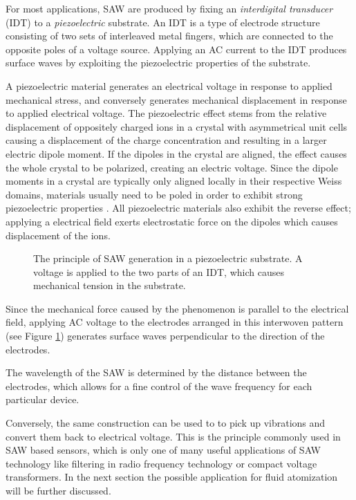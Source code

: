 For most applications, SAW are produced by fixing an \emph{interdigital transducer} (IDT) to a \emph{piezoelectric} substrate. An IDT is a type of electrode structure consisting of two sets of interleaved metal fingers, which are connected to the opposite poles of a voltage source. Applying an AC current to the IDT produces surface waves by exploiting the piezoelectric properties of the substrate.

A piezoelectric material generates an electrical voltage in response to applied mechanical stress, and conversely generates mechanical displacement in response to applied electrical voltage. 
The piezoelectric effect stems from the relative displacement of oppositely charged ions in a crystal with asymmetrical unit cells causing a displacement of the charge concentration and resulting in a larger electric dipole moment. 
If the dipoles in the crystal are aligned, the effect causes the whole crystal to be polarized, creating an electric voltage. 
Since the dipole moments in a crystal are typically only aligned locally in their respective Weiss domains, materials usually need to be poled in order to exhibit strong piezoelectric properties \cite{liLeadfreePiezoelectricMaterials2021}.
All piezoelectric materials also exhibit the reverse effect; applying a electrical field exerts electrostatic force on the dipoles which causes displacement of the ions.

\begin{figure}[htbp]
    \centering
    \caption{The principle of SAW generation in a piezoelectric substrate. A voltage is applied to the two parts of an IDT, which causes mechanical tension in the substrate.}
    \label{fig:idt}
\end{figure}

Since the mechanical force caused by the phenomenon is parallel to the electrical field, applying AC voltage to the electrodes arranged in this interwoven pattern (see Figure \ref{fig:idt}) generates surface waves perpendicular to the direction of the electrodes.

The wavelength of the SAW is determined by the distance between the electrodes, which allows for a fine control of the wave frequency for each particular device.

Conversely, the same construction can be used to to pick up vibrations and convert them back to electrical voltage. 
This is the principle commonly used in SAW based sensors, which is only one of many useful applications of SAW technology like filtering in radio frequency technology or compact voltage transformers. 
In the next section the possible application for fluid atomization will be further discussed.